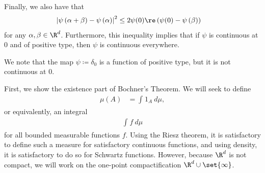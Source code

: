 \documentclass[10pt]{mypackage}
\renewcommand{\coloneq}{\coloneqq}
\begin{document}
Finally, we also have that
\begin{align*}
  \left\vert \psi\left( \alpha + \beta \right) - \psi\left( \alpha \right) \right\vert^2 &\leq 2\psi(0)\re\left( \psi(0)-\psi\left( \beta \right) \right)
\end{align*}
for any $\alpha,\beta\in \R^d$. Furthermore, this inequality implies that if $\psi$ is continuous at $0$ and of positive type, then $\psi$ is continuous everywhere.

We note that the map $\psi\coloneq \delta_0$ is a function of positive type, but it is not continuous at $0$.

First, we show the existence part of Bochner's Theorem. We will seek to define
\begin{align*}
  \mu(A) &= \int_{}^{} 1_{A}\:d\mu,
\end{align*}
or equivalently, an integral
\begin{align*}
  \int_{}^{} f\:d\mu
\end{align*}
for all bounded measurable functions $f$. Using the Riesz theorem, it is satisfactory to define such a measure for satisfactory continuous functions, and using density, it is satisfactory to do so for Schwartz functions. However, because $\R^d$ is not compact, we will work on the one-point compactification $\R^d\cup\set{\infty}$.
\end{document}

